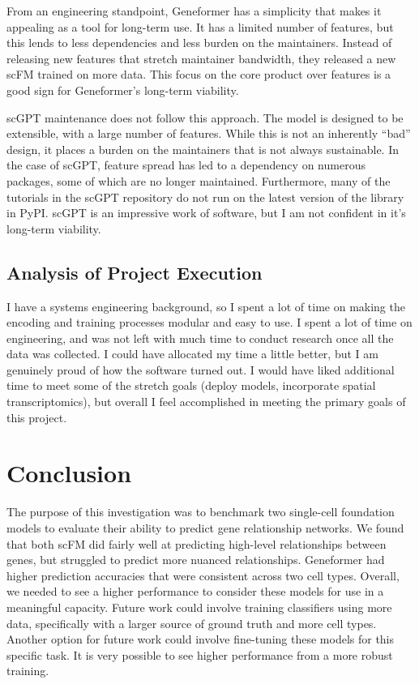 \documentclass[12pt, letterpaper]{report}
\let\oldsection\section
\renewcommand{\section}{\clearpage\oldsection}
\begin{document}
From an engineering standpoint, Geneformer has a simplicity that makes it appealing as a tool for long-term use. It has a limited number of features, but this lends to less dependencies and less burden on the maintainers. Instead of releasing new features that stretch maintainer bandwidth, they released a new scFM trained on more data. This focus on the core product over features is a good sign for Geneformer's long-term viability.

scGPT maintenance does not follow this approach. The model is designed to be extensible, with a large number of features. While this is not an inherently ``bad'' design, it places a burden on the maintainers that is not always sustainable. In the case of scGPT, feature spread has led to a dependency on numerous packages, some of which are no longer maintained. Furthermore, many of the tutorials in the scGPT repository do not run on the latest version of the library in PyPI. scGPT is an impressive work of software, but I am not confident in it's long-term viability.


\section{Analysis of Project Execution}

I have a systems engineering background, so I spent a lot of time on making the encoding and training processes modular and easy to use. I spent a lot of time on engineering, and was not left with much time to conduct research once all the data was collected. I could have allocated my time a little better, but I am genuinely proud of how the software turned out. I would have liked additional time to meet some of the stretch goals (deploy models, incorporate spatial transcriptomics), but overall I feel accomplished in meeting the primary goals of this project.


\chapter{Conclusion}
\label{ch:conclusion}

The purpose of this investigation was to benchmark two single-cell foundation models to evaluate their ability to predict gene relationship networks. We found that both scFM did fairly well at predicting high-level relationships between genes, but struggled to predict more nuanced relationships. Geneformer had higher prediction accuracies that were consistent across two cell types. Overall, we needed to see a higher performance to consider these models for use in a meaningful capacity. Future work could involve training classifiers using more data, specifically with a larger source of ground truth and more cell types. Another option for future work could involve fine-tuning these models for this specific task. It is very possible to see higher performance from a more robust training.
\end{document}
